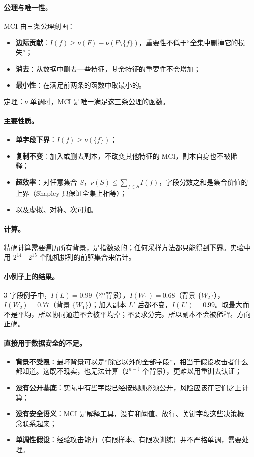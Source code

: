 \documentclass[zihao=-4,a4paper]{ctexart}
\begin{document}
\paragraph{公理与唯一性。}MCI 由三条公理刻画：
\begin{itemize}[leftmargin=*]
  \item \textbf{边际贡献}：$I(f)\ge \nu(F)-\nu(F\setminus\{f\})$，重要性不低于“全集中删掉它的损失”；
  \item \textbf{消去}：从数据中删去一些特征，其余特征的重要性不会增加；
  \item \textbf{最小性}：在满足前两条的函数中取最小的。
\end{itemize}
定理：$\nu$ 单调时，MCI 是唯一满足这三条公理的函数。

\paragraph{主要性质。}
\begin{itemize}[leftmargin=*]
  \item \textbf{单字段下界}：$I(f)\ge\nu(\{f\})$；
  \item \textbf{复制不变}：加入或删去副本，不改变其他特征的 MCI，副本自身也不被稀释；
  \item \textbf{超效率}：对任意集合 $S$，$\nu(S)\le\sum_{f\in S}I(f)$，字段分数之和是集合价值的上界（Shapley 只保证全集上相等）；
  \item 以及虚拟、对称、次可加。
\end{itemize}

\paragraph{计算。}精确计算需要遍历所有背景，是指数级的；任何采样方法都只能得到\textbf{下界}。实验中用 $2^{14}$—$2^{15}$ 个随机排列的前驱集合来估计。

\paragraph{小例子上的结果。}3 字段例子中，$I(L)=0.99$（空背景），$I(W_1)=0.68$（背景 $\{W_2\}$），$I(W_2)=0.77$（背景 $\{W_1\}$）；加入副本 $L'$ 后都不变，$I(L')=0.99$。取最大而不是平均，所以协同通道不会被平均掉；不要求分完，所以副本不会被稀释。方向正确。

\paragraph{直接用于数据安全的不足。}
\begin{itemize}[leftmargin=*]
  \item \textbf{背景不受限}：最坏背景可以是“除它以外的全部字段”，相当于假设攻击者什么都知道。这既不现实，也无法计算（$2^{n-1}$ 个背景），更难以用重训去认证；
  \item \textbf{没有公开基底}：实际中有些字段已经按规则必须公开，风险应该在它们之上计算；
  \item \textbf{没有安全语义}：MCI 是解释工具，没有和阈值、放行、关键字段这些决策概念联系起来；
  \item \textbf{单调性假设}：经验攻击能力（有限样本、有限次训练）并不严格单调，需要处理。
\end{itemize}
\end{document}
